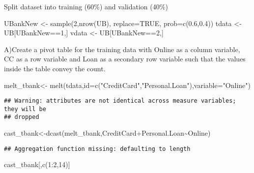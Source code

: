 \documentclass[
]{article}
\newenvironment{Shaded}{\begin{snugshade}}{\end{snugshade}}
\newcommand{\AttributeTok}[1]{\textcolor[rgb]{0.77,0.63,0.00}{#1}}
\newcommand{\ConstantTok}[1]{\textcolor[rgb]{0.00,0.00,0.00}{#1}}
\newcommand{\DecValTok}[1]{\textcolor[rgb]{0.00,0.00,0.81}{#1}}
\newcommand{\FloatTok}[1]{\textcolor[rgb]{0.00,0.00,0.81}{#1}}
\newcommand{\FunctionTok}[1]{\textcolor[rgb]{0.00,0.00,0.00}{#1}}
\newcommand{\NormalTok}[1]{#1}
\newcommand{\OtherTok}[1]{\textcolor[rgb]{0.56,0.35,0.01}{#1}}
\newcommand{\SpecialCharTok}[1]{\textcolor[rgb]{0.00,0.00,0.00}{#1}}
\newcommand{\StringTok}[1]{\textcolor[rgb]{0.31,0.60,0.02}{#1}}
\begin{document}
Split dataset into training (60\%) and validation (40\%)

\begin{Shaded}
\begin{Highlighting}[]
\NormalTok{UBankNew }\OtherTok{\textless{}{-}} \FunctionTok{sample}\NormalTok{(}\DecValTok{2}\NormalTok{,}\FunctionTok{nrow}\NormalTok{(UB), }\AttributeTok{replace=}\ConstantTok{TRUE}\NormalTok{, }\AttributeTok{prob=}\FunctionTok{c}\NormalTok{(}\FloatTok{0.6}\NormalTok{,}\FloatTok{0.4}\NormalTok{))}
\NormalTok{tdata }\OtherTok{\textless{}{-}}\NormalTok{ UB[UBankNew}\SpecialCharTok{==}\DecValTok{1}\NormalTok{,]}
\NormalTok{vdata }\OtherTok{\textless{}{-}}\NormalTok{ UB[UBankNew}\SpecialCharTok{==}\DecValTok{2}\NormalTok{,]}
\end{Highlighting}
\end{Shaded}

A)Create a pivot table for the training data with Online as a column
variable, CC as a row variable and Loan as a secondary row variable such
that the values inside the table convey the count.

\begin{Shaded}
\begin{Highlighting}[]
\NormalTok{melt\_tbank}\OtherTok{\textless{}{-}} \FunctionTok{melt}\NormalTok{(tdata,}\AttributeTok{id=}\FunctionTok{c}\NormalTok{(}\StringTok{"CreditCard"}\NormalTok{,}\StringTok{"Personal.Loan"}\NormalTok{),}\AttributeTok{variable=}\StringTok{"Online"}\NormalTok{)}
\end{Highlighting}
\end{Shaded}

\begin{verbatim}
## Warning: attributes are not identical across measure variables; they will be
## dropped
\end{verbatim}

\begin{Shaded}
\begin{Highlighting}[]
\NormalTok{cast\_tbank}\OtherTok{\textless{}{-}}\FunctionTok{dcast}\NormalTok{(melt\_tbank,CreditCard}\SpecialCharTok{+}\NormalTok{Personal.Loan}\SpecialCharTok{\textasciitilde{}}\NormalTok{Online)}
\end{Highlighting}
\end{Shaded}

\begin{verbatim}
## Aggregation function missing: defaulting to length
\end{verbatim}

\begin{Shaded}
\begin{Highlighting}[]
\NormalTok{cast\_tbank[,}\FunctionTok{c}\NormalTok{(}\DecValTok{1}\SpecialCharTok{:}\DecValTok{2}\NormalTok{,}\DecValTok{14}\NormalTok{)]}
\end{Highlighting}
\end{Shaded}
\end{document}

